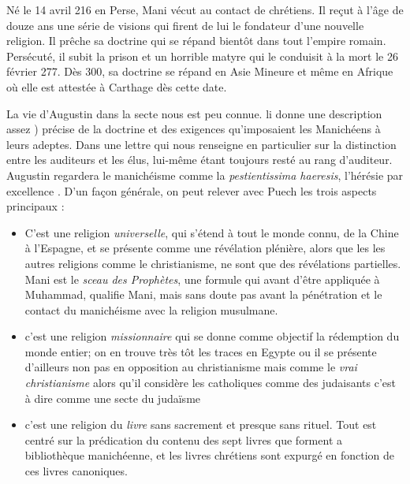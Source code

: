 Né le 14 avril 216 en Perse, Mani vécut au contact de chrétiens. Il reçut à l'âge de douze ans une série de visions qui firent de lui le fondateur d'une nouvelle religion. Il prêche sa doctrine qui se répand bientôt dans tout l'empire romain. Persécuté, il subit la prison et un horrible matyre qui le conduisit à la mort le 26 février 277. Dès 300, sa doctrine se répand en Asie Mineure et même en Afrique où elle est attestée à Carthage dès cette date.

La vie d'Augustin dans la secte nous est peu connue. li donne une description assez
)	précise de la doctrine	et	des exigences qu'imposaient les Manichéens à leurs adeptes. Dans une lettre qui nous renseigne en particulier sur la distinction entre les
auditeurs et les élus, lui-même étant toujours resté au rang d'auditeur. Augustin regardera le manichéisme comme la \textit{pestientissima haeresis}, l'hérésie par excellence . 
D'un façon générale, on peut relever avec Puech les trois aspects principaux :
\begin{itemize}
    \item C'est une religion \textit{universelle}, qui s'étend à tout le monde connu, de la Chine à l'Espagne, et se présente comme une révélation plénière, alors que les les autres religions comme le christianisme, ne sont que des révélations partielles. Mani est le \textit{sceau des Prophètes}, une formule qui avant d'être appliquée à Muhammad, qualifie Mani, mais sans doute pas avant la pénétration et le contact du manichéisme avec la religion musulmane. 
    \item c'est une religion \textit{missionnaire} qui se donne comme objectif la rédemption du monde entier; on en trouve très tôt les traces en Egypte ou il se présente d'ailleurs non pas en opposition au christianisme mais comme le \textit{vrai christianisme} alors qu'il considère les catholiques comme des judaisants  c'est à dire comme une secte du judaïsme
    \item c'est une religion du \textit{livre } sans sacrement et presque sans rituel. Tout est centré sur la prédication du contenu des sept livres que forment a bibliothèque manichéenne, et les livres chrétiens sont expurgé en fonction de ces livres canoniques.
\end{itemize}



